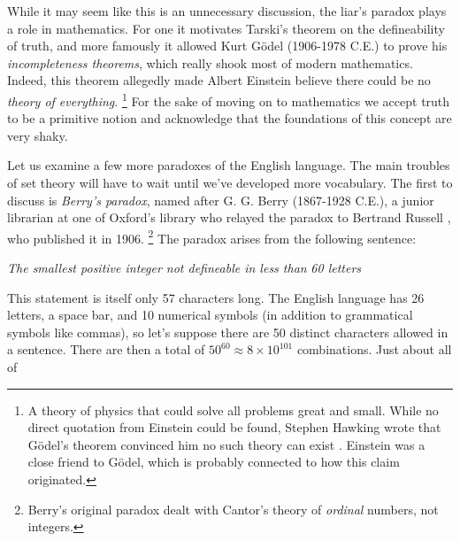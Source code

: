         While it may seem like this is an unnecessary discussion, the liar's
        paradox plays a role in mathematics. For one it motivates Tarski's
        theorem on the defineability of truth, and more famously it allowed Kurt
        G\"{o}del (1906-1978 C.E.) to prove his
        \textit{incompleteness theorems}, which really shook most of modern
        mathematics. Indeed, this theorem allegedly made Albert
        Einstein believe there could be no
        \textit{theory of everything}.%
        \footnote{%
            A theory of physics that could solve all problems great and small.
            While no direct quotation from Einstein could be found, Stephen
            Hawking wrote that G\"{o}del's theorem convinced him no such theory
            can exist \cite{hawking2002godel}. Einstein was a close friend to
            G\"{o}del, which is probably connected to how this claim originated.
        }
        For the sake of moving on to mathematics we accept truth to be a
        primitive notion and acknowledge that the foundations of this concept
        are very shaky.
        \par\hfill\par
        Let us examine a few more paradoxes of the English language. The main
        troubles of set theory will have to wait until we've developed more
        vocabulary. The first to discuss is
        \textit{Berry's paradox},
        named after G. G. Berry (1867-1928 C.E.), a junior
        librarian at one of Oxford's library who relayed the paradox to Bertrand
        Russell \cite[p.~63]{CamCompBertRuss03}, who
        published it in 1906.%
        \footnote{%
            Berry's original paradox dealt with Cantor's theory of
            \textit{ordinal} numbers, not integers.
        }
        The paradox arises from the following sentence:
        \begin{center}
            \textit{The smallest positive integer not defineable in less than}
            \textit{60 letters}
        \end{center}
        This statement is itself only 57 characters long. The English language
        has 26 letters, a space bar, and 10 numerical symbols (in addition to
        grammatical symbols like commas), so let's suppose there are 50 distinct
        characters allowed in a sentence. There are then a total of
        $50^{60}\approx{8}\times{10}^{101}$ combinations. Just about all of
